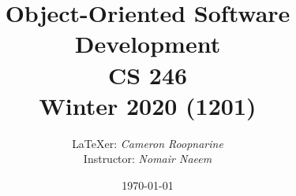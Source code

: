 


\usepackage{tikz-uml}

\title{
\LARGE Object-Oriented Software Development\\
\large CS 246\\
\normalsize Winter 2020 (1201)}
\author{\LaTeX{}er: \emph{Cameron Roopnarine}\\Instructor: \emph{Nomair Naeem}}
\date{\today}



\maketitle
\tableofcontents






















